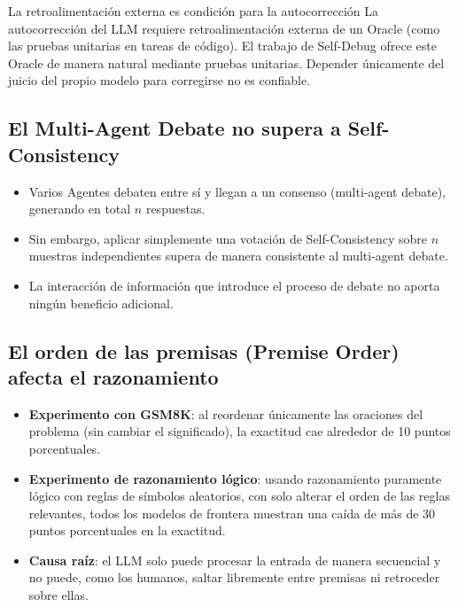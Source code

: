 \begin{importantbox}{La retroalimentación externa es condición para la autocorrección}
La autocorrección del LLM requiere retroalimentación externa de un Oracle (como las pruebas unitarias en tareas de código). El trabajo de Self-Debug ofrece este Oracle de manera natural mediante pruebas unitarias. Depender únicamente del juicio del propio modelo para corregirse no es confiable.
\end{importantbox}

\subsection{El Multi-Agent Debate no supera a Self-Consistency}

\begin{itemize}
    \item Varios Agentes debaten entre sí y llegan a un consenso (multi-agent debate), generando en total $n$ respuestas.
    \item Sin embargo, aplicar simplemente una votación de Self-Consistency sobre $n$ muestras independientes supera de manera consistente al multi-agent debate.
    \item La interacción de información que introduce el proceso de debate no aporta ningún beneficio adicional.
\end{itemize}

\subsection{El orden de las premisas (Premise Order) afecta el razonamiento}

\begin{itemize}
    \item \textbf{Experimento con GSM8K}: al reordenar únicamente las oraciones del problema (sin cambiar el significado), la exactitud cae alrededor de 10 puntos porcentuales.
    \item \textbf{Experimento de razonamiento lógico}: usando razonamiento puramente lógico con reglas de símbolos aleatorios, con solo alterar el orden de las reglas relevantes, todos los modelos de frontera muestran una caída de más de 30 puntos porcentuales en la exactitud.
    \item \textbf{Causa raíz}: el LLM solo puede procesar la entrada de manera secuencial y no puede, como los humanos, saltar libremente entre premisas ni retroceder sobre ellas.
\end{itemize}

